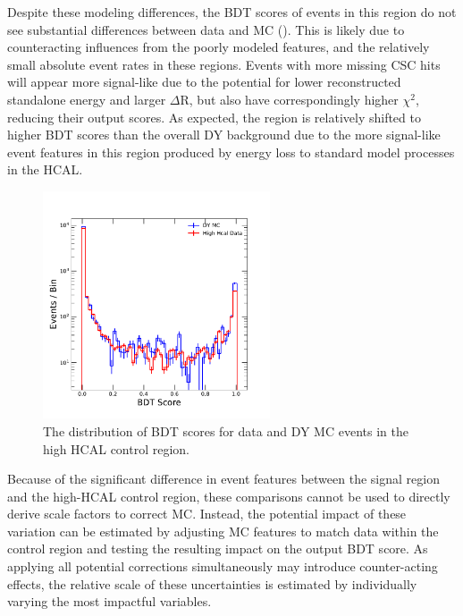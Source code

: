 Despite these modeling differences, the BDT scores of events in this region do not see substantial differences between data and MC ().
This is likely due to counteracting influences from the poorly modeled features, and the relatively small absolute event rates in these regions. 
Events with more missing CSC hits will appear more signal-like due to the potential for lower reconstructed standalone energy and larger $\Delta$R, but also have correspondingly higher $\chi^{2}$, reducing their output scores.
As expected, the region is relatively shifted to higher BDT scores than the overall DY background due to the more signal-like event features in this region produced by energy loss to standard model processes in the HCAL. 

\begin{figure}[htbp]
	\label{fig:BDTscorevalid}
	\centering
	\includegraphics[width=0.6\textwidth]{figures/highHcalValid.pdf}
        \caption[BDT Validation in the High HCAL Energy Control Region]{The distribution of BDT scores for data and DY MC events in the high HCAL control region.}
\end{figure}

Because of the significant difference in event features between the signal region and the high-HCAL control region, these comparisons cannot be used to directly derive scale factors to correct MC. 
Instead, the potential impact of these variation can be estimated by adjusting MC features to match data within the control region and testing the resulting impact on the output BDT score.
As applying all potential corrections simultaneously may introduce counter-acting effects, the relative scale of these uncertainties is estimated by individually varying the most impactful variables.

